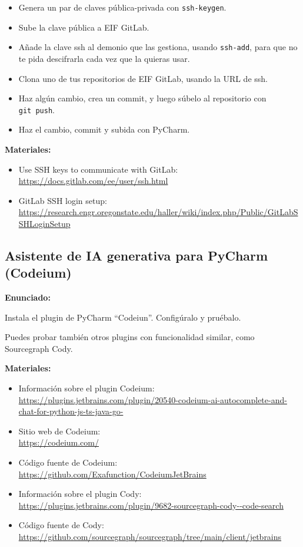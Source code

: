 \begin{itemize}
\item Genera un par de claves pública-privada con \texttt{ssh-keygen}.
\item Sube la clave pública a EIF GitLab.
\item Añade la clave ssh al demonio que las gestiona, usando \texttt{ssh-add}, para que no te pida descifrarla cada vez que la quieras usar.
\item Clona uno de tus repositorios de EIF GitLab, usando la URL de ssh.
\item Haz algún cambio, crea un commit, y luego súbelo al repositorio con \texttt{git~push}.
\item Haz el cambio, commit y subida con PyCharm.
\end{itemize}

\textbf{Materiales:}

\begin{itemize}
\item Use SSH keys to communicate with GitLab: \\
  \url{https://docs.gitlab.com/ee/user/ssh.html}
\item GitLab SSH login setup: \\
  \url{https://research.engr.oregonstate.edu/haller/wiki/index.php/Public/GitLabSSHLoginSetup}
\end{itemize}


\subsection{Asistente de IA generativa para PyCharm (Codeium)}
\label{subsec:practicas-pycharm-ia-codeium}

\textbf{Enunciado:}

Instala el plugin de PyCharm ``Codeiun''. Configúralo y pruébalo.

Puedes probar también otros plugins con funcionalidad similar, como Sourcegraph Cody.

\textbf{Materiales:}

\begin{itemize}
\item Información sobre el plugin Codeium: \\
  \url{https://plugins.jetbrains.com/plugin/20540-codeium-ai-autocomplete-and-chat-for-python-js-ts-java-go-}
\item Sitio web de Codeium: \\
  \url{https://codeium.com/}
\item Código fuente de Codeium: \\
  \url{https://github.com/Exafunction/CodeiumJetBrains}
\item Información sobre el plugin Cody: \\
  \url{https://plugins.jetbrains.com/plugin/9682-sourcegraph-cody--code-search}
\item Código fuente de Cody: \\
  \url{https://github.com/sourcegraph/sourcegraph/tree/main/client/jetbrains}
\end{itemize}

